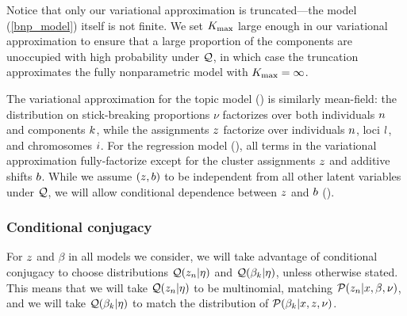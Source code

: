 Notice that only our variational approximation is truncated---the model
(\eqref{bnp_model}) itself is not finite.
We set ${K_{\mathrm{max}}}$ large enough in our variational approximation to ensure that a large
proportion of the components are unoccupied with high probability under $\mathcal{Q}$,
in which case the truncation approximates the fully nonparametric model with ${K_{\mathrm{max}}} = \infty$.

The variational approximation for the topic model ()
is similarly mean-field: the distribution on stick-breaking proportions $\nu$
factorizes over
both individuals $n$ and components $k$, while the
assignments $z$
factorize over individuals $n$, loci $l$, and chromosomes $i$.
For the regression model (), all terms in the
variational approximation fully-factorize
except for the cluster assignments $z$ and additive shifts $b$.
While we assume $(z, b)$ to be independent from all other latent variables
under $\mathcal{Q}$, we will allow conditional dependence between $z$ and $b$ ().

\subsubsection{Conditional conjugacy}

For $z$ and $\beta$ in all models we consider, we will
take advantage of conditional conjugacy to choose distributions
$\mathcal{Q}(z_n\vert\eta)$ and $\mathcal{Q}(\beta_k\vert\eta)$, unless otherwise stated.
This means that we will take $\mathcal{Q}(z_{n}
\vert \eta)$ to be multinomial, matching $\mathcal{P}(z_{n}
\vert x, \beta, \nu)$, and we will take $\mathcal{Q}(\beta_k \vert \eta)$
to match the distribution of $\mathcal{P}(\beta_{k} \vert x, z, \nu)$.



